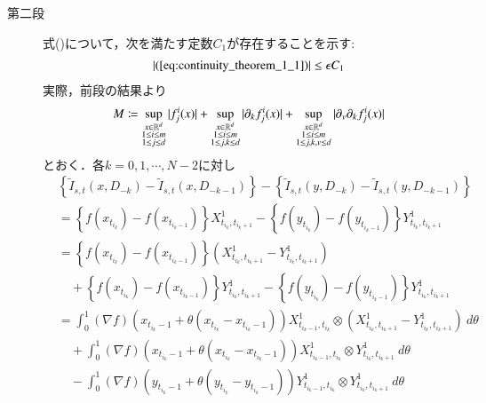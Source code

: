 \begin{prf}
\begin{description}
			\item[第二段]
				式()について，次を満たす定数$C_1$が存在することを示す:
				\begin{align}
					|(\refeq{eq:continuity_theorem_1_1})| \leq \epsilon C_1
					\label{eq:continuity_theorem_1_3}
				\end{align}
				実際，前段の結果より
				\begin{align}
					M \coloneqq
						\operatorname*{sup}_{\substack{x \in \mathbb{R}^d \\ 1 \leq i \leq m \\ 1 \leq j \leq d}} |f^i_j(x)| 
						+ \operatorname*{sup}_{\substack{x \in \mathbb{R}^d \\ 1 \leq i \leq m \\ 1 \leq j,k \leq d}} |\partial_k f^i_j(x)|
						+ \operatorname*{sup}_{\substack{x \in \mathbb{R}^d \\ 1 \leq i \leq m \\ 1 \leq j,k,v \leq d}} |\partial_v \partial_k f^i_j(x)|
					\label{eq:continuity_theorem_1_4}
				\end{align}
				とおく．各$k = 0,1,\cdots,N-2$に対し
				\begin{align}
					&\left\{ \tilde{I}_{s,t}(x,D_{-k}) - \tilde{I}_{s,t}(x,D_{-k-1}) \right\} - 
						\left\{ \tilde{I}_{s,t}(y,D_{-k}) - \tilde{I}_{s,t}(y,D_{-k-1}) \right\} \\
					&=	\left\{ f(x_{t_{i_k}}) - f(x_{t_{i_k-1}}) \right\} X^1_{t_{i_k},t_{i_k+1}}
						- \left\{ f(y_{t_{i_k}}) - f(y_{t_{i_k-1}}) \right\} Y^1_{t_{i_k},t_{i_k+1}} \\
					&= \left\{ f(x_{t_{i_k}}) - f(x_{t_{i_k-1}}) \right\} \left( X^1_{t_{i_k},t_{i_k+1}} - Y^1_{t_{i_k},t_{i_k+1}} \right) \\
						&\quad +\left\{ f(x_{t_{i_k}}) - f(x_{t_{i_k-1}}) \right\} Y^1_{t_{i_k},t_{i_k+1}} - \left\{ f(y_{t_{i_k}}) - f(y_{t_{i_k-1}}) \right\} Y^1_{t_{i_k},t_{i_k+1}} \\
					&= \int_0^1 (\nabla f)( x_{t_{i_k}-1}+\theta ( x_{t_{i_k}}-x_{t_{i_k}-1} ))
						X^1_{t_{i_k-1},t_{i_k}} \otimes \left( X^1_{t_{i_k},t_{i_k+1}} - Y^1_{t_{i_k},t_{i_k+1}} \right)\ d\theta \\
						&\quad + \int_0^1 (\nabla f)( x_{t_{i_k}-1}+\theta ( x_{t_{i_k}}-x_{t_{i_k}-1} ))
						X^1_{t_{i_k-1},t_{i_k}} \otimes Y^1_{t_{i_k},t_{i_k+1}}\ d\theta \\
						&\quad - \int_0^1 (\nabla f)( y_{t_{i_k}-1}+\theta ( y_{t_{i_k}}-y_{t_{i_k}-1} ))
						Y^1_{t_{i_k-1},t_{i_k}} \otimes Y^1_{t_{i_k},t_{i_k+1}}\ d\theta \\

\end{align}
\end{description}
\end{prf}
